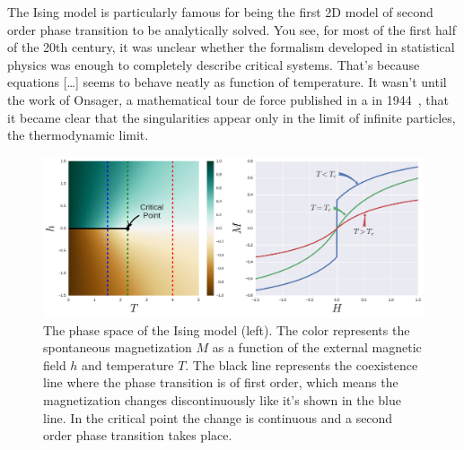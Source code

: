The Ising model is particularly famous for being the first 2D model of second
order phase transition to be analytically solved. You see, for most of the
first half of the 20th century, it was unclear whether the formalism developed
in statistical physics was enough to completely describe critical systems.
That's because equations [\ldots] seems to behave neatly as function of
temperature. It wasn't until the work of Onsager, a mathematical tour de force
published in a in 1944~\cite{Onsager1944}, that it became clear that the
singularities appear only in the limit of infinite particles, the thermodynamic
limit.


\begin{figure}
\begin{center}
    \includegraphics[width=\textwidth]{chapters/ch2-crit/figs/ising_phase2}
\end{center}
\caption{The phase space of the Ising model (left). The color represents the
    spontaneous magnetization $M$ as a function of the external magnetic field
    $h$ and temperature $T$. The black line represents the coexistence line
    where the phase transition is of first order, which means the magnetization
    changes discontinuously like it's shown in the blue line. In the critical
    point the change is continuous and a second order phase transition takes
    place.}
\label{fig:ising_phase2}
\end{figure}



